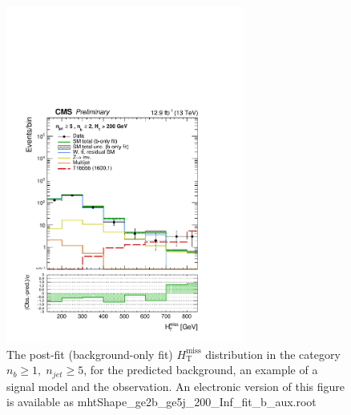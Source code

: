 \begin{figure}[tbhp]
    \caption{ 
    The post-fit (background-only fit) $H_{\mathrm{T}}^{\mathrm{miss}}$ distribution in the category $n_{b}\geq 1, \; n_{jet} \geq 5$, 
    for the predicted background, an example of a signal model and the observation.
    An electronic version of this figure is available as mhtShape\_ge2b\_ge5j\_200\_Inf\_fit\_b\_aux.root
    \label{fig:mhtShape_ge2b_ge5j_fit_b} }
  \begin{center}
  \includegraphics[width=0.7\textwidth]{mhtShape_ge2b_ge5j_200_Inf_fit_b_aux}
  \end{center}
\end{figure}
